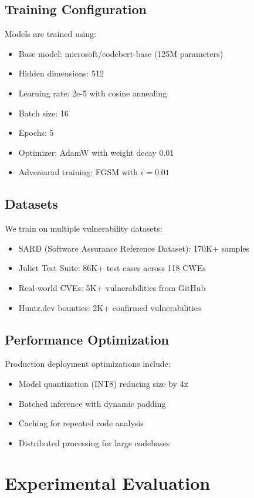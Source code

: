 \documentclass[10pt,journal,compsoc]{IEEEtran}
\begin{document}
\subsection{Training Configuration}
Models are trained using:
\begin{itemize}
\item Base model: microsoft/codebert-base (125M parameters)
\item Hidden dimensions: 512
\item Learning rate: 2e-5 with cosine annealing
\item Batch size: 16
\item Epochs: 5
\item Optimizer: AdamW with weight decay 0.01
\item Adversarial training: FGSM with $\epsilon = 0.01$
\end{itemize}

\subsection{Datasets}
We train on multiple vulnerability datasets:
\begin{itemize}
\item SARD (Software Assurance Reference Dataset): 170K+ samples
\item Juliet Test Suite: 86K+ test cases across 118 CWEs
\item Real-world CVEs: 5K+ vulnerabilities from GitHub
\item Huntr.dev bounties: 2K+ confirmed vulnerabilities
\end{itemize}

\subsection{Performance Optimization}
Production deployment optimizations include:
\begin{itemize}
\item Model quantization (INT8) reducing size by 4x
\item Batched inference with dynamic padding
\item Caching for repeated code analysis
\item Distributed processing for large codebases
\end{itemize}

\section{Experimental Evaluation}
\end{document}
